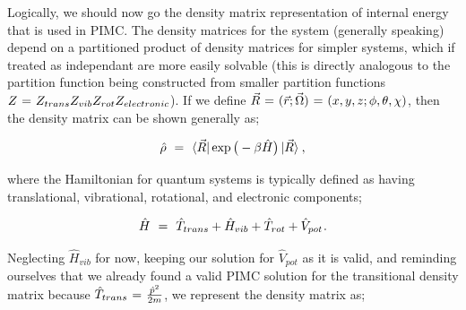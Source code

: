 \documentclass{article}
\begin{document}
Logically, we should now go the density matrix representation of internal energy that is used in PIMC. The density matrices for the system (generally speaking) depend on a partitioned product of density matrices for simpler systems, which if treated as independant are more easily solvable (this is directly analogous to the partition function being constructed from smaller partition functions \begin{math} Z \hspace{0.025cm} = \hspace{0.025cm} Z_{trans} Z_{vib} Z_{rot} Z_{electronic} \end{math}). If we define \begin{math} \vec{R} \hspace{0.025cm} = \hspace{0.025cm} (\vec{r};\vec{\Omega})  \hspace{0.025cm} = \hspace{0.025cm} (x,y,z;\phi,\theta,\chi) \end{math}, then the density matrix can be shown generally as;

\begin{equation} \label{eq:1}
\hat{\rho} \hspace{0.125cm} = \hspace{0.125cm} \bra{\vec{R}} \exp \big( - \beta \hat{H} \big) \ket{\vec{R}} \hspace{0.025cm} , 
\end{equation}

where the Hamiltonian for quantum systems is typically defined as having translational, vibrational, rotational, and electronic components;

\begin{equation} \label{eq:1}
\hat{H} \hspace{0.125cm} = \hspace{0.125cm} \hat{T}_{trans} + \hat{H}_{vib} + \hat{T}_{rot} + \hat{V}_{pot} \hspace{0.025cm} .
\end{equation}

Neglecting \begin{math} \hat{H}_{vib} \end{math} for now, keeping our solution for \begin{math} \hat{V}_{pot} \end{math} as it is valid, and reminding ourselves that we already found a valid PIMC solution for the transitional density matrix because \begin{math} \hat{T}_{trans} \hspace{0.025cm} = \hspace{0.025cm} \frac{\hat{p}^2}{2 m} \end{math}, we represent the density matrix as;
\end{document}
